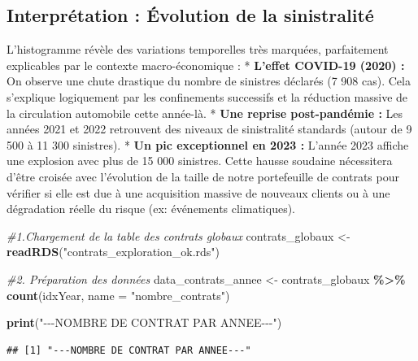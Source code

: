 \documentclass[
]{article}
\newenvironment{Shaded}{\begin{snugshade}}{\end{snugshade}}
\newcommand{\AttributeTok}[1]{\textcolor[rgb]{0.13,0.29,0.53}{#1}}
\newcommand{\CommentTok}[1]{\textcolor[rgb]{0.56,0.35,0.01}{\textit{#1}}}
\newcommand{\FunctionTok}[1]{\textcolor[rgb]{0.13,0.29,0.53}{\textbf{#1}}}
\newcommand{\NormalTok}[1]{#1}
\newcommand{\OtherTok}[1]{\textcolor[rgb]{0.56,0.35,0.01}{#1}}
\newcommand{\SpecialCharTok}[1]{\textcolor[rgb]{0.81,0.36,0.00}{\textbf{#1}}}
\newcommand{\StringTok}[1]{\textcolor[rgb]{0.31,0.60,0.02}{#1}}
\begin{document}
\subsection{Interprétation : Évolution de la
sinistralité}\label{interpruxe9tation-uxe9volution-de-la-sinistralituxe9}

L'histogramme révèle des variations temporelles très marquées,
parfaitement explicables par le contexte macro-économique : *
\textbf{L'effet COVID-19 (2020) :} On observe une chute drastique du
nombre de sinistres déclarés (7 908 cas). Cela s'explique logiquement
par les confinements successifs et la réduction massive de la
circulation automobile cette année-là. * \textbf{Une reprise
post-pandémie :} Les années 2021 et 2022 retrouvent des niveaux de
sinistralité standards (autour de 9 500 à 11 300 sinistres). *
\textbf{Un pic exceptionnel en 2023 :} L'année 2023 affiche une
explosion avec plus de 15 000 sinistres. Cette hausse soudaine
nécessitera d'être croisée avec l'évolution de la taille de notre
portefeuille de contrats pour vérifier si elle est due à une acquisition
massive de nouveaux clients ou à une dégradation réelle du risque (ex:
événements climatiques).

\begin{Shaded}
\begin{Highlighting}[]
\CommentTok{\#1.Chargement de la table des contrats globaux }
\NormalTok{contrats\_globaux }\OtherTok{\textless{}{-}} \FunctionTok{readRDS}\NormalTok{(}\StringTok{"contrats\_exploration\_ok.rds"}\NormalTok{)}
\end{Highlighting}
\end{Shaded}

\begin{Shaded}
\begin{Highlighting}[]
\CommentTok{\#2. Préparation des données }
\NormalTok{data\_contrats\_annee }\OtherTok{\textless{}{-}}\NormalTok{ contrats\_globaux }\SpecialCharTok{\%\textgreater{}\%} 
  \FunctionTok{count}\NormalTok{(idxYear, }\AttributeTok{name =} \StringTok{"nombre\_contrats"}\NormalTok{)}

\FunctionTok{print}\NormalTok{(}\StringTok{"{-}{-}{-}NOMBRE DE CONTRAT PAR ANNEE{-}{-}{-}"}\NormalTok{)}
\end{Highlighting}
\end{Shaded}

\begin{verbatim}
## [1] "---NOMBRE DE CONTRAT PAR ANNEE---"
\end{verbatim}
\end{document}
